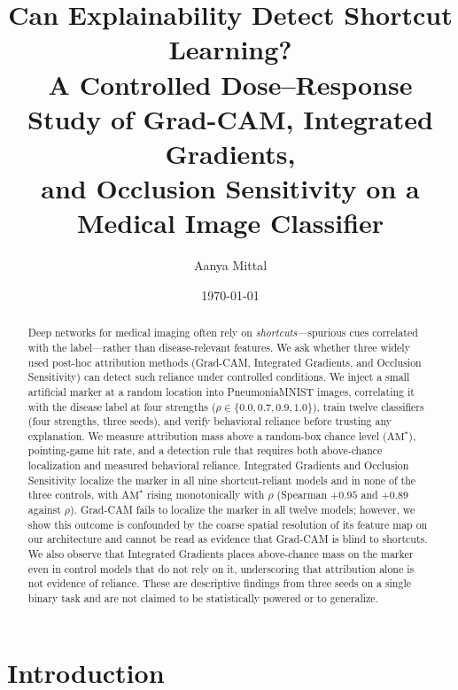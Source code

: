 \documentclass[11pt]{article}
\title{Can Explainability Detect Shortcut Learning?\\
\large A Controlled Dose--Response Study of Grad-CAM, Integrated Gradients,\\ and Occlusion Sensitivity on a Medical Image Classifier}
\author{Aanya Mittal}
\date{\today}
\begin{document}
\maketitle

\begin{abstract}
Deep networks for medical imaging often rely on \emph{shortcuts}---spurious cues correlated
with the label---rather than disease-relevant features. We ask whether three widely used
post-hoc attribution methods (Grad-CAM, Integrated Gradients, and Occlusion Sensitivity) can
detect such reliance under controlled conditions. We inject a small artificial marker at a
random location into PneumoniaMNIST images, correlating it with the disease label at four
strengths ($\rho \in \{0.0, 0.7, 0.9, 1.0\}$), train twelve classifiers (four strengths,
three seeds), and verify behavioral reliance before trusting any explanation. We measure
attribution mass above a random-box chance level ($\mathrm{AM}^{\star}$), pointing-game hit
rate, and a detection rule that requires both above-chance localization and measured behavioral
reliance. Integrated Gradients and Occlusion Sensitivity localize the marker in all nine
shortcut-reliant models and in none of the three controls, with $\mathrm{AM}^{\star}$ rising
monotonically with $\rho$ (Spearman $+0.95$ and $+0.89$ against $\rho$). Grad-CAM fails to
localize the marker in all twelve models; however, we show this outcome is confounded by the
coarse spatial resolution of its feature map on our architecture and cannot be read as evidence
that Grad-CAM is blind to shortcuts. We also observe that Integrated Gradients places
above-chance mass on the marker even in control models that do not rely on it, underscoring that
attribution alone is not evidence of reliance. These are descriptive findings from three seeds
on a single binary task and are not claimed to be statistically powered or to generalize.
\end{abstract}

\section{Introduction}
\label{sec:intro}
\end{document}
